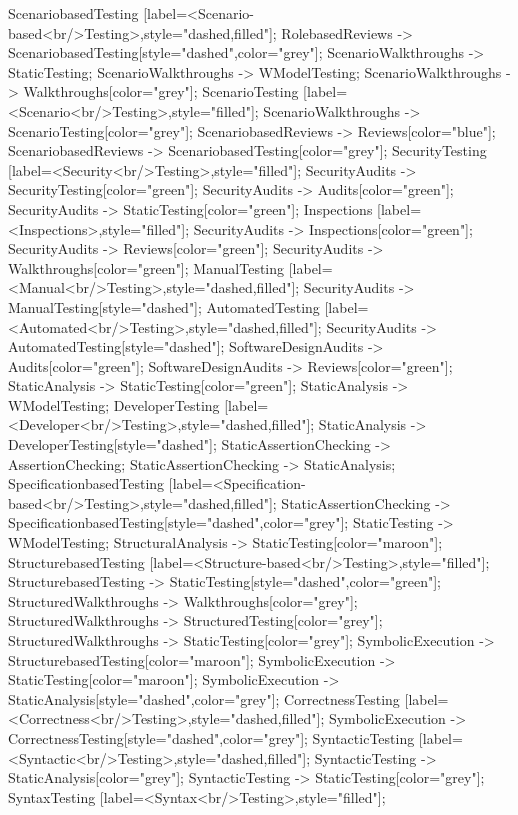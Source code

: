 \documentclass{article}
\begin{document}
{ScenariobasedTesting [label=<Scenario-based<br/>Testing>,style="dashed,filled"];
RolebasedReviews -> ScenariobasedTesting[style="dashed",color="grey"];
ScenarioWalkthroughs -> StaticTesting;
ScenarioWalkthroughs -> WModelTesting;
ScenarioWalkthroughs -> Walkthroughs[color="grey"];
ScenarioTesting [label=<Scenario<br/>Testing>,style="filled"];
ScenarioWalkthroughs -> ScenarioTesting[color="grey"];
ScenariobasedReviews -> Reviews[color="blue"];
ScenariobasedReviews -> ScenariobasedTesting[color="grey"];
SecurityTesting [label=<Security<br/>Testing>,style="filled"];
SecurityAudits -> SecurityTesting[color="green"];
SecurityAudits -> Audits[color="green"];
SecurityAudits -> StaticTesting[color="green"];
Inspections [label=<Inspections>,style="filled"];
SecurityAudits -> Inspections[color="green"];
SecurityAudits -> Reviews[color="green"];
SecurityAudits -> Walkthroughs[color="green"];
ManualTesting [label=<Manual<br/>Testing>,style="dashed,filled"];
SecurityAudits -> ManualTesting[style="dashed"];
AutomatedTesting [label=<Automated<br/>Testing>,style="dashed,filled"];
SecurityAudits -> AutomatedTesting[style="dashed"];
SoftwareDesignAudits -> Audits[color="green"];
SoftwareDesignAudits -> Reviews[color="green"];
StaticAnalysis -> StaticTesting[color="green"];
StaticAnalysis -> WModelTesting;
DeveloperTesting [label=<Developer<br/>Testing>,style="dashed,filled"];
StaticAnalysis -> DeveloperTesting[style="dashed"];
StaticAssertionChecking -> AssertionChecking;
StaticAssertionChecking -> StaticAnalysis;
SpecificationbasedTesting [label=<Specification-based<br/>Testing>,style="dashed,filled"];
StaticAssertionChecking -> SpecificationbasedTesting[style="dashed",color="grey"];
StaticTesting -> WModelTesting;
StructuralAnalysis -> StaticTesting[color="maroon"];
StructurebasedTesting [label=<Structure-based<br/>Testing>,style="filled"];
StructurebasedTesting -> StaticTesting[style="dashed",color="green"];
StructuredWalkthroughs -> Walkthroughs[color="grey"];
StructuredWalkthroughs -> StructuredTesting[color="grey"];
StructuredWalkthroughs -> StaticTesting[color="grey"];
SymbolicExecution -> StructurebasedTesting[color="maroon"];
SymbolicExecution -> StaticTesting[color="maroon"];
SymbolicExecution -> StaticAnalysis[style="dashed",color="grey"];
CorrectnessTesting [label=<Correctness<br/>Testing>,style="dashed,filled"];
SymbolicExecution -> CorrectnessTesting[style="dashed",color="grey"];
SyntacticTesting [label=<Syntactic<br/>Testing>,style="dashed,filled"];
SyntacticTesting -> StaticAnalysis[color="grey"];
SyntacticTesting -> StaticTesting[color="grey"];
SyntaxTesting [label=<Syntax<br/>Testing>,style="filled"];
}
\end{document}
